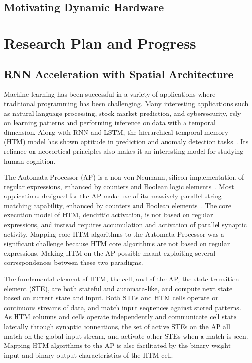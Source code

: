 \subsection{Motivating Dynamic Hardware}

\section{Research Plan and Progress}

\subsection{RNN Acceleration with Spatial Architecture}
Machine learning has been successful in a variety of applications where traditional programming has been challenging.
Many interesting applications such as natural language processing, stock market prediction, and cybersecurity, rely on learning patterns and performing inference on data with a temporal dimension.
Along with RNN and LSTM, the hierarchical temporal memory (HTM) model has shown aptitude in prediction and anomaly detection tasks~\cite{stock_trading,ecg_anomaly}.
Its reliance on neocortical principles also makes it an interesting model for studying human cognition.

The Automata Processor (AP) is a non-von Neumann, silicon implementation of regular expressions, enhanced by counters and Boolean logic elements~\cite{dlugosch:TPDS2014}. 
Most applications designed for the AP make use of its massively parallel string matching capability, enhanced by counters and Boolean elements~\cite{Ke:IPDPS2015,zhou2015brill,wadden2016anmlzoo}. 
The core execution model of HTM, dendritic activation, is not based on regular expressions, and instead requires accumulation and activation of parallel synaptic activity. 
Mapping core HTM algorithms to the Automata Processor was a significant challenge because HTM core algorithms are not based on regular expressions. 
Making HTM on the AP possible meant exploiting several correspondences between these two paradigms.

The fundamental element of HTM, the cell, and of the AP, the state transition element (STE), are both stateful and automata-like, and compute next state based on current state and input.
Both STEs and HTM cells operate on continuous streams of data, and match input sequences against stored patterns.
As HTM columns and cells operate independently and communicate cell state laterally through synaptic connections, the set of active STEs on the AP all match on the global input stream, and activate other STEs when a match is seen.
Mapping HTM algorithms to the AP is also facilitated by the binary weight input and binary output characteristics of the HTM cell.

